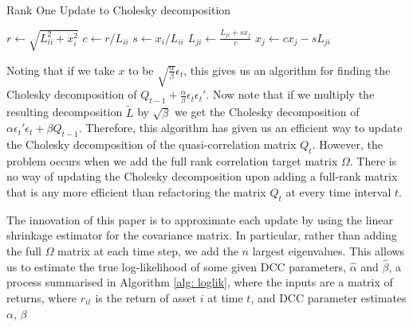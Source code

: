 \documentclass{article} %
\numberwithin{equation}{section} %
\numberwithin{figure}{section} %
\numberwithin{table}{section} %
\begin{document}
\begin{algorithm}
\caption{Rank One Update to Cholesky decomposition}\label{rank one update}
\begin{algorithmic}[1]
\State $r \gets \sqrt{L_{ii}^2 + x_i^2}$
\State $c \gets r / L_{ii}$
\State $s \gets x_i/L_{ii}$
\State $L_{ji} \gets \frac{L_{ji} + sx_{j}}{c}$
\State $x_j \gets c x_j - sL_{ji}$
\EndFor
\EndFor
\EndProcedure
\end{algorithmic}
\end{algorithm}

Noting that if we take $x$ to be $\sqrt{\frac{\alpha}{\beta}}\epsilon_t$, this gives us an algorithm for finding the Cholesky decomposition of $Q_{t-1} + \frac{\alpha }{\beta}\epsilon_t \epsilon_t'$. Now note that if we multiply the resulting decomposition $\tilde{L}$ by $\sqrt{\beta}$ we get the Cholesky decomposition of $\alpha \epsilon_t' \epsilon_t + \beta Q_{t-1}$. Therefore, this algorithm has given us an efficient way to update the Cholesky decomposition of the quasi-correlation matrix $Q_t$. However, the problem occurs when we add the full rank correlation target matrix $\Omega$. There is no way of updating the Cholesky decomposition upon adding a full-rank matrix that is any more efficient than refactoring the matrix $Q_t$ at every time interval $t$.

The innovation of this paper is to approximate each update by using the linear shrinkage estimator for the covariance matrix. In particular, rather than adding the full $\Omega$ matrix at each time step, we add the $n$ largest eigenvalues. This allows us to estimate the true log-likelihood of some given DCC parameters, $\hat{\alpha}$ and  $\hat{\beta}$, a process summarised in Algorithm \ref{alg: loglik}, where the inputs are a matrix of returns, where $r_{it}$ is the return of asset $i$ at time $t$, and DCC parameter estimates $\alpha$, $\beta$
\end{document}
